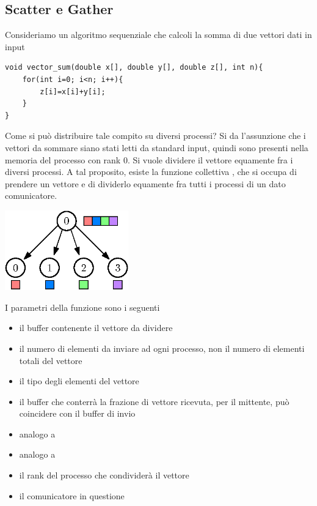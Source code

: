 \documentclass[10pt, letterpaper]{report}
\begin{document}
\subsection{Scatter e Gather}
Consideriamo un algoritmo sequenziale che calcoli la somma di due vettori dati in input 
\begin{lstlisting}[style=CStyle]
void vector_sum(double x[], double y[], double z[], int n){
    for(int i=0; i<n; i++){
        z[i]=x[i]+y[i];
    }
}
\end{lstlisting}
Come si può distribuire tale compito su diversi processi? Si da l'assunzione che i vettori da 
sommare siano stati letti da standard input, quindi sono presenti nella memoria del processo con 
rank 0. Si vuole dividere il vettore equamente fra i diversi processi.\acc 
A tal proposito, esiste la funzione collettiva , che si occupa di prendere un 
vettore e di dividerlo equamente fra tutti i processi di un dato comunicatore.\begin{center}
    \includegraphics[width=0.4\textwidth]{images/scatter.eps}
\end{center}
I parametri della funzione sono i seguenti\begin{itemize}
    \item {} il buffer contenente il vettore da dividere
    \item  {} il numero di elementi da inviare ad ogni processo, non il numero di elementi 
    totali del vettore
    \item  {} il tipo degli elementi del vettore 
    \item  {} il buffer che conterrà la frazione di vettore ricevuta, per il mittente, può 
    coincidere con il buffer di invio 
    \item  {} analogo a 
    \item  {} analogo a 
    \item  {} il rank del processo che condividerà il vettore 
    \item {} il comunicatore in questione
\end{itemize}
\end{document}
